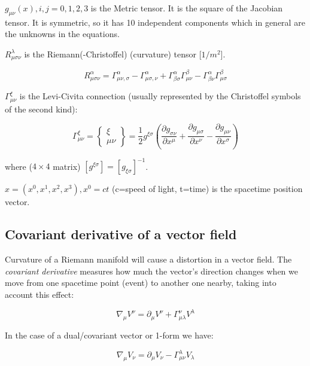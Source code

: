 $g_{\mu\nu}(x),i,j=0,1,2,3$ is the Metric tensor. It is the square of the Jacobian tensor. It is symmetric, so it has 10 independent components which in general are the unknowns in the equations.

$R^{\lambda}_{\mu\sigma\nu}$ is the Riemann(-Christoffel) (curvature) tensor [$1/m^2$].

\[
R^{\alpha}_{\mu\sigma\nu} = \Gamma^{\alpha}_{\mu\nu,\sigma} - \Gamma^{\alpha}_{\mu\sigma,\nu} + \Gamma^{\alpha}_{\beta\sigma} \Gamma^{\beta}_{\mu\nu} - \Gamma^{\alpha}_{\beta\nu} \Gamma^{\beta}_{\mu\sigma}
\]

$\Gamma_{\mu\nu}^{\xi}$ is the Levi-Civita connection (usually represented by the Christoffel symbols of the second kind):

\[
	\Gamma_{\mu\nu}^{\xi} = \left\{ \begin{array}{c}
		\xi \\
		\mu\nu
	\end{array} \right\} =
	\frac{1}{2}g^{\xi\sigma}\left(\frac{\partial g_{\sigma\nu}}{\partial x^{\mu}} + \frac{\partial g_{\mu\sigma}}{\partial x^{\nu}} - \frac{\partial g_{\mu\nu}}{\partial x^{\sigma}}\right)
\]

where ($4 \times 4$ matrix) $\left[g^{\xi\sigma}\right] = \left[g_{\xi\sigma}\right]^{-1}$.

$x=(x^0,x^1,x^2,x^3),x^0=ct$ (c=speed of light, t=time) is the spacetime position vector.


\subsection{Covariant derivative of a vector field}

Curvature of a Riemann manifold will cause a distortion in a vector field. The \emph{covariant derivative} measures how much the vector's direction changes when we move from one spacetime point (event) to another one nearby, taking into account this effect:

\[
\nabla_\mu V^\nu = \partial_\mu V^\nu + \Gamma^\nu_{\mu \lambda} V^\lambda
\]

In the case of a dual/covariant vector or 1-form we have:

\[
\nabla_\mu V_\nu = \partial_\mu V_\nu - \Gamma^\lambda_{\mu \nu} V_\lambda
\]